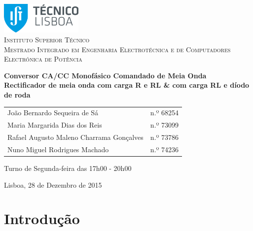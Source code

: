\documentclass[a4paper,11pt]{article}
\numberwithin{equation}{section}
\begin{document}
\begin{titlepage}
\begin{center}

\hfill \break
\hfill \break

\includegraphics[width=0.3\textwidth]{img/logo}~\\[1cm] 

\textsc{\LARGE Instituto Superior Técnico}\\[0.25cm]
\textsc{\Large Mestrado Integrado em Engenharia Electrotécnica e de Computadores}\\[1.8cm]
\textsc{\huge Electrónica de Potência}\\[0.25cm]

\vspace{6mm}

{\huge \bfseries Conversor CA/CC Monofásico \linebreak Comandado de Meia Onda \\[0.7cm]}
{\bfseries Rectificador de meia onda com carga R e RL \& com carga RL e díodo de roda \\[1cm]}

\begin{tabular}{ l l }
	João Bernardo Sequeira de Sá & \hspace{2mm} n.º 68254 \\
	Maria Margarida Dias dos Reis & \hspace{2mm} n.º 73099 \\
	Rafael Augusto Maleno Charrama Gonçalves & \hspace{2mm} n.º 73786 \\
	Nuno Miguel Rodrigues Machado & \hspace{2mm} n.º 74236
\end{tabular}

\vspace{7mm}

Turno de Segunda-feira das 17h00 - 20h00

\vfill

{\large Lisboa, 28 de Dezembro de 2015} 
	
\end{center}
\end{titlepage}
	
\tableofcontents
\pagebreak

\section{Introdução}
\end{document}
